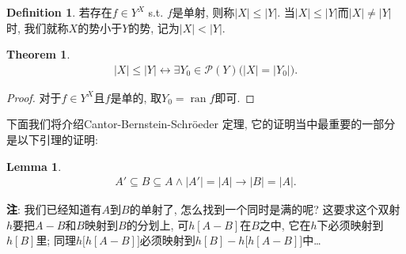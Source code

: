 \documentclass[openany]{ctexbook}
\theoremstyle{plain}
\newtheorem{theorem}{Theorem}[section] %
\newtheorem{lemma}{Lemma} %
\theoremstyle{definition}
\newtheorem{definition}{Definition}[section] %
\DeclareMathOperator{\ran}{ran}
\begin{document}
\begin{definition}
若存在$f \in Y^X$ s.t. $f$是单射, 则称$|X|\leq |Y|$. 
当$|X|\leq |Y|$而$|X|\neq |Y|$时, 我们就称$X$的势小于$Y$的势, 记为$|X| < |Y|$.
\end{definition}

\begin{theorem}
\begin{align*}
|X| \leq |Y| \leftrightarrow \exists Y_0\in \mathscr P(Y) \big(|X| = |Y_0| \big).
\end{align*}
\end{theorem}
\begin{proof}
对于$f\in Y^X$且$f$是单的, 取$Y_0 = \ran f$即可.
\end{proof}

下面我们将介绍Cantor-Bernstein-Schr\"oeder 定理, 它的证明当中最重要的一部分是以下引理的证明:
\begin{lemma}\label{lemma_CBS}
\begin{align*}
	A'\subseteq B \subseteq A \wedge |A'|=|A| 
		\to |B|=|A|.
\end{align*}
\end{lemma}
\textbf{注}: 我们已经知道有$A$到$B$的单射了, 怎么找到一个同时是满的呢? 
这要求这个双射$h$要把$A-B$和$B$映射到$B$的分划上, 可$h[A-B]$在$B$之中, 它在$h$下必须映射到$h[B]$里; 
同理$h\big\lbrack h[A-B]\big\rbrack$必须映射到$h[B]-h\big\lbrack h[A-B]\big\rbrack$中\ldots
\end{document}
